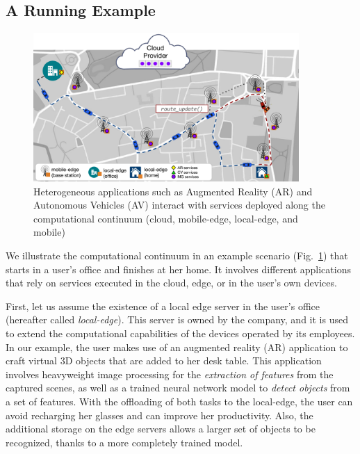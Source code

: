 \subsection{A Running Example}
\label{sub:example}

\begin{figure}[tbp]
	\includegraphics[width=0.9\textwidth]{figs/Continuum-Scenario}
	\caption{Heterogeneous applications such as Augmented Reality (AR) and Autonomous Vehicles (AV) interact with services deployed along the computational continuum (cloud, mobile-edge, local-edge, and mobile)}
	\label{fig:continuum-scenario}
\end{figure}

We illustrate the computational continuum in an example scenario (Fig.~\ref{fig:continuum-scenario}) that starts in a user's office and finishes at her home. It involves different applications that rely on services executed in the cloud, edge, or in the user's own devices. 

First, let us assume the existence of a local edge server in the user's office (hereafter called \textit{local-edge}). This server is owned by the company, and it is used to extend the computational capabilities of the devices operated by its employees. In our example, the user makes use of an augmented reality (AR) application to craft virtual 3D objects that are added to her desk table. This application involves heavyweight image processing for 
the \textit{extraction of features} from the captured scenes, as well as a trained neural network model to \textit{detect objects} from a set of features. With the offloading of both tasks to the local-edge, the user can avoid recharging her glasses and can improve her productivity. Also, the additional storage on the edge servers allows a larger set of objects to be recognized, thanks to a more completely trained model.

